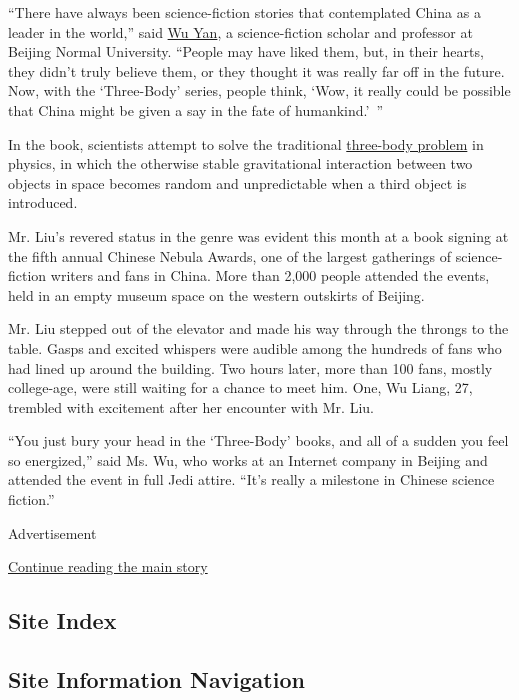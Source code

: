 ``There have always been science-fiction stories that contemplated China
as a leader in the world,'' said
\href{http://paper-republic.org/authors/wu-yan/}{Wu Yan}, a
science-fiction scholar and professor at Beijing Normal University.
``People may have liked them, but, in their hearts, they didn't truly
believe them, or they thought it was really far off in the future. Now,
with the `Three-Body' series, people think, `Wow, it really could be
possible that China might be given a say in the fate of humankind.'~''

In the book, scientists attempt to solve the traditional
\href{http://news.sciencemag.org/physics/2013/03/physicists-discover-whopping-13-new-solutions-three-body-problem}{three-body
problem} in physics, in which the otherwise stable gravitational
interaction between two objects in space becomes random and
unpredictable when a third object is introduced.

Mr. Liu's revered status in the genre was evident this month at a book
signing at the fifth annual Chinese Nebula Awards, one of the largest
gatherings of science-fiction writers and fans in China. More than 2,000
people attended the events, held in an empty museum space on the western
outskirts of Beijing.

Mr. Liu stepped out of the elevator and made his way through the throngs
to the table. Gasps and excited whispers were audible among the hundreds
of fans who had lined up around the building. Two hours later, more than
100 fans, mostly college-age, were still waiting for a chance to meet
him. One, Wu Liang, 27, trembled with excitement after her encounter
with Mr. Liu.

``You just bury your head in the `Three-Body' books, and all of a sudden
you feel so energized,'' said Ms. Wu, who works at an Internet company
in Beijing and attended the event in full Jedi attire. ``It's really a
milestone in Chinese science fiction.''

Advertisement

\protect\hyperlink{after-bottom}{Continue reading the main story}

\hypertarget{site-index}{%
\subsection{Site Index}\label{site-index}}

\hypertarget{site-information-navigation}{%
\subsection{Site Information
Navigation}\label{site-information-navigation}}

